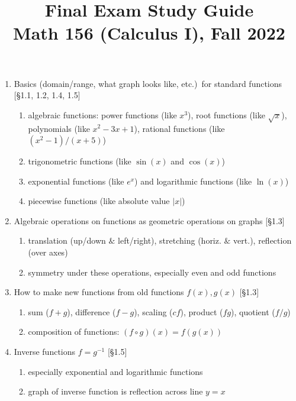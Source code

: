 \documentclass[11pt]{article}
\title{Final Exam Study Guide \\ Math 156 (Calculus I), Fall 2022}
\date{}
\begin{document}
\maketitle

\pagestyle{empty}
\thispagestyle{empty}

\vspace{-2.3cm}

\begin{enumerate}
\item Basics (domain/range, what graph looks like, etc.)~for standard functions [\S1.1, 1.2, 1.4, 1.5]
\begin{enumerate}
\item algebraic functions: power functions (like $x^3$), root functions (like $\sqrt{x}$), \\ polynomials (like $x^2-3x+1$), rational functions (like $(x^2-1)/(x+5)$)
\item trigonometric functions (like $\sin(x)$ and $\cos(x)$)
\item exponential functions (like $e^x$) and logarithmic functions (like $\ln(x)$)
\item piecewise functions (like absolute value $|x|$)
\end{enumerate}

\item Algebraic operations on functions as geometric operations on graphs [\S1.3]
\begin{enumerate}
\item translation (up/down $\&$ left/right), stretching (horiz. $\&$ vert.), reflection (over axes)
\item symmetry under these operations, especially even and odd functions
\end{enumerate}

\item How to make new functions from old functions $f(x), g(x)$ [\S1.3]
\begin{enumerate}
\item sum ($f+g$), difference ($f-g$), scaling ($cf$), product ($fg$), quotient ($f/g$)
\item composition of functions: $(f \circ g)(x) = f(g(x))$
\end{enumerate}

\item Inverse functions $f=g^{-1}$ [\S1.5]
\begin{enumerate}
\item especially exponential and logarithmic functions
\item graph of inverse function is reflection across line $y=x$
\end{enumerate}


\end{enumerate}
\end{document}

